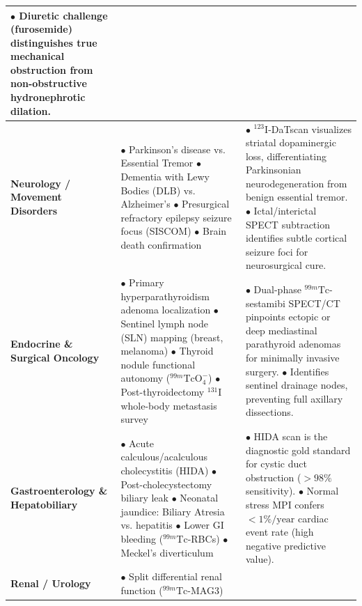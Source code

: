 \documentclass[11pt,a4paper]{article}
\begin{document}
\begin{longtable}{p{3.2cm}p{6cm}p{6cm}}
$\bullet$ Diuretic challenge (furosemide) distinguishes true mechanical obstruction from non-obstructive hydronephrotic dilation. \\
\midrule
\textbf{Neurology / Movement Disorders} & 
$\bullet$ Parkinson's disease vs. Essential Tremor\newline
$\bullet$ Dementia with Lewy Bodies (DLB) vs. Alzheimer's\newline
$\bullet$ Presurgical refractory epilepsy seizure focus (SISCOM)\newline
$\bullet$ Brain death confirmation & 
$\bullet$ $^{123}\text{I}$-DaTscan visualizes striatal dopaminergic loss, differentiating Parkinsonian neurodegeneration from benign essential tremor.\newline
$\bullet$ Ictal/interictal SPECT subtraction identifies subtle cortical seizure foci for neurosurgical cure. \\
\midrule
\textbf{Endocrine \& Surgical Oncology} & 
$\bullet$ Primary hyperparathyroidism adenoma localization\newline
$\bullet$ Sentinel lymph node (SLN) mapping (breast, melanoma)\newline
$\bullet$ Thyroid nodule functional autonomy ($^{99m}\text{TcO}_4^-$)\newline
$\bullet$ Post-thyroidectomy $^{131}\text{I}$ whole-body metastasis survey & 
$\bullet$ Dual-phase $^{99m}\text{Tc}$-sestamibi SPECT/CT pinpoints ectopic or deep mediastinal parathyroid adenomas for minimally invasive surgery.\newline
$\bullet$ Identifies sentinel drainage nodes, preventing full axillary dissections. \\
\midrule
\textbf{Gastroenterology \& Hepatobiliary} & 
$\bullet$ Acute calculous/acalculous cholecystitis (HIDA)\newline
$\bullet$ Post-cholecystectomy biliary leak\newline
$\bullet$ Neonatal jaundice: Biliary Atresia vs. hepatitis\newline
$\bullet$ Lower GI bleeding ($^{99m}\text{Tc}$-RBCs)\newline
$\bullet$ Meckel's diverticulum & 
$\bullet$ HIDA scan is the diagnostic gold standard for cystic duct obstruction ($>98\%$ sensitivity).\newline
$\bullet$ Normal stress MPI confers $<1\%/\text{year}$ cardiac event rate (high negative predictive value). \\
\midrule
\textbf{Renal / Urology} & 
$\bullet$ Split differential renal function ($^{99m}\text{Tc}$-MAG3)\newline

\end{longtable}
\end{document}

